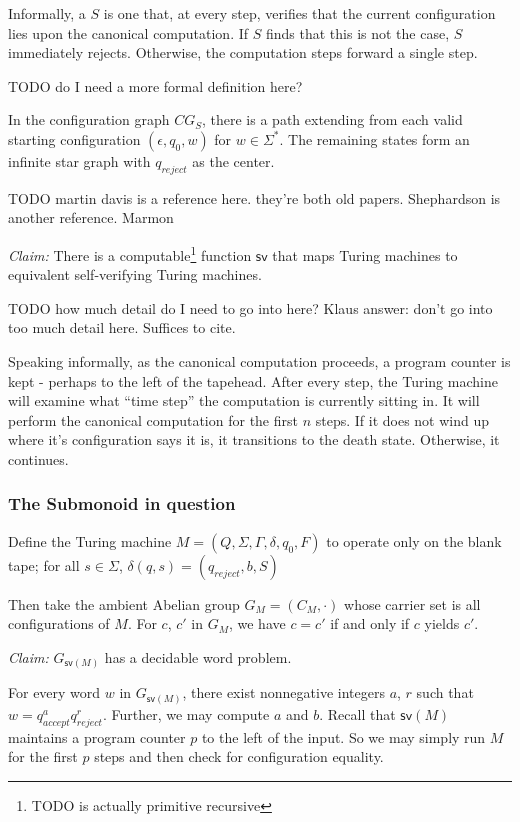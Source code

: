 \documentclass[11pt]{article}
\begin{document}
Informally, a  $S$ is one that, at
every step, verifies that the current configuration lies upon the
canonical computation. If $S$ finds that this is not the case, $S$
immediately rejects. Otherwise, the computation steps forward a single
step.

TODO do I need a more formal definition here?

In the configuration graph $CG_S$, there is a path extending from each
valid starting configuration $(\epsilon, q_0, w)$ for $w \in \Sigma^*$. The remaining states form an infinite star graph with $q_{reject}$ as the center.

TODO martin davis is a reference here. they're both old
papers. Shephardson is another reference. Marmon

\textit{Claim:} There is a computable\footnote{TODO is actually primitive recursive} function $\textsf{sv}$ that maps Turing
machines to equivalent self-verifying Turing machines.

TODO how much detail do I need to go into here? Klaus answer: don't go
into too much detail here. Suffices to cite.

Speaking informally, as the canonical computation proceeds, a program
counter is kept - perhaps to the left of the tapehead. After every
step, the Turing machine will examine what ``time step'' the
computation is currently sitting in. It will perform the canonical
computation for the first $n$ steps. If it does not wind up where it's
configuration says it is, it transitions to the death
state. Otherwise, it continues.

\subsubsection*{The Submonoid in question}
Define the Turing machine $M = (Q, \Sigma, \Gamma, \delta, q_0, F)$ to
operate only on the blank tape; for all $s \in \Sigma$,
$\delta(q, s) = (q_{reject}, b, S)$


Then take the ambient Abelian group $G_M = (C_M, \cdot)$ whose carrier
set is all configurations of $M$. For $c$, $c'$ in $G_M$, we have
$c = c'$ if and only if $c$ yields $c'$.

\textit{Claim:} $G_{\textsf{sv}(M)}$ has a decidable word problem.

For every word $w$ in $G_{\textsf{sv}(M)}$, there exist nonnegative
integers $a$, $r$ such that $w = q_{accept}^a q_{reject}^r$. Further,
we may compute $a$ and $b$. Recall that $\textsf{sv}(M)$ maintains a
program counter $p$ to the left of the input. So we may simply run $M$
for the first $p$ steps and then check for configuration equality.
\end{document}
